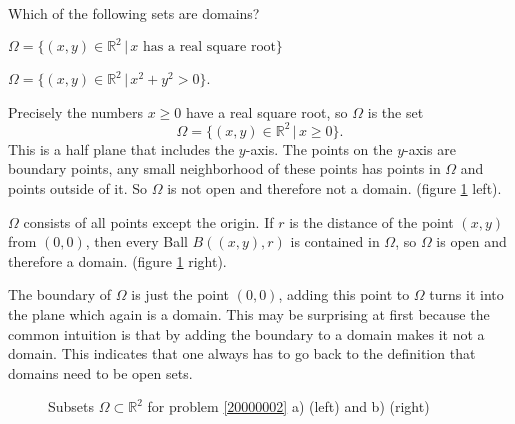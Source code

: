 Which of the following sets are domains?
\begin{teilaufgaben}
\item $\Omega=\{(x,y)\in\mathbb R^2\,|\, \text{$x$ has a real square root}\}$
\item $\Omega=\{(x,y)\in\mathbb R^2\,|\, x^2+y^2>0\}$.
\end{teilaufgaben}


\begin{loesung}
\begin{teilaufgaben}
\item
Precisely the numbers
$x\ge 0$ have a real square root, so $\Omega$ is the set
\[
\Omega=\{(x,y)\in\mathbb R^2\,|\, x\ge 0\}.
\]
This is a half plane that includes the $y$-axis.
The points on the $y$-axis are boundary points, any small neighborhood of
these points has points in $\Omega$ and points outside of it.
So $\Omega$ is not open and therefore not a domain.
(figure \ref{20000002:fig} left).
\item
$\Omega$ consists of all points except the origin.
If $r$ is the distance of the point $(x,y)$ from $(0,0)$, then every
Ball
$B((x,y),r)$ is contained in $\Omega$, so $\Omega$ is open and therefore
a domain.
(figure \ref{20000002:fig} right).

The boundary of $\Omega$ is just the point $(0,0)$, adding this point
to $\Omega$ turns it into the plane which again is a domain.
This may be surprising at first because the common intuition is that
by adding the boundary to a domain makes it not a domain.
This indicates that one always has to go back to the definition
that domains need to be open sets.
\qedhere
\end{teilaufgaben}
\begin{figure}
\begin{center}
\end{center}
\caption{Subsets $\Omega\subset\mathbb R^2$ for problem \ref{20000002} a)
(left)
and b) (right)\label{20000002:fig}}
\end{figure}
\end{loesung}
